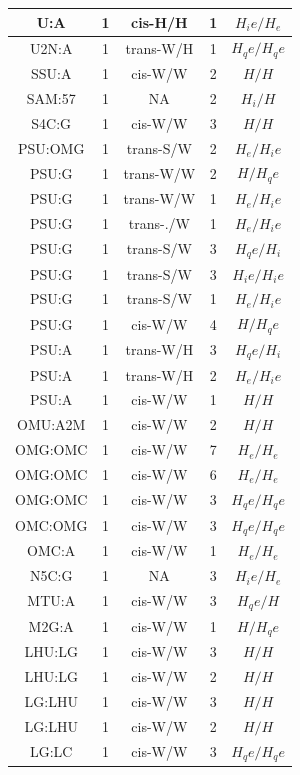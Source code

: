 \begin{center}
\begin{longtable}{c|c|c|c|c}
U:A & 1 & cis-H/H & 1 & $H_ie/H_e$ \\  \hline
U2N:A & 1 & trans-W/H & 1 & $H_qe/H_qe$ \\  \hline
SSU:A & 1 & cis-W/W & 2 & $H/H$ \\  \hline
SAM:57 & 1 & NA & 2 & $H_i/H$ \\  \hline
S4C:G & 1 & cis-W/W & 3 & $H/H$ \\  \hline
PSU:OMG & 1 & trans-S/W & 2 & $H_e/H_ie$ \\  \hline
PSU:G & 1 & trans-W/W & 2 & $H/H_qe$ \\  \hline
PSU:G & 1 & trans-W/W & 1 & $H_e/H_ie$ \\  \hline
PSU:G & 1 & trans-./W & 1 & $H_e/H_ie$ \\  \hline
PSU:G & 1 & trans-S/W & 3 & $H_qe/H_i$ \\  \hline
PSU:G & 1 & trans-S/W & 3 & $H_ie/H_ie$ \\  \hline
PSU:G & 1 & trans-S/W & 1 & $H_e/H_ie$ \\  \hline
PSU:G & 1 & cis-W/W & 4 & $H/H_qe$ \\  \hline
PSU:A & 1 & trans-W/H & 3 & $H_qe/H_i$ \\  \hline
PSU:A & 1 & trans-W/H & 2 & $H_e/H_ie$ \\  \hline
PSU:A & 1 & cis-W/W & 1 & $H/H$ \\  \hline
OMU:A2M & 1 & cis-W/W & 2 & $H/H$ \\  \hline
OMG:OMC & 1 & cis-W/W & 7 & $H_e/H_e$ \\  \hline
OMG:OMC & 1 & cis-W/W & 6 & $H_e/H_e$ \\  \hline
OMG:OMC & 1 & cis-W/W & 3 & $H_qe/H_qe$ \\  \hline
OMC:OMG & 1 & cis-W/W & 3 & $H_qe/H_qe$ \\  \hline
OMC:A & 1 & cis-W/W & 1 & $H_e/H_e$ \\  \hline
N5C:G & 1 & NA & 3 & $H_ie/H_e$ \\  \hline
MTU:A & 1 & cis-W/W & 3 & $H_qe/H$ \\  \hline
M2G:A & 1 & cis-W/W & 1 & $H/H_qe$ \\  \hline
LHU:LG & 1 & cis-W/W & 3 & $H/H$ \\  \hline
LHU:LG & 1 & cis-W/W & 2 & $H/H$ \\  \hline
LG:LHU & 1 & cis-W/W & 3 & $H/H$ \\  \hline
LG:LHU & 1 & cis-W/W & 2 & $H/H$ \\  \hline
LG:LC & 1 & cis-W/W & 3 & $H_qe/H_qe$ \\  \hline

\end{longtable}
\end{center}
